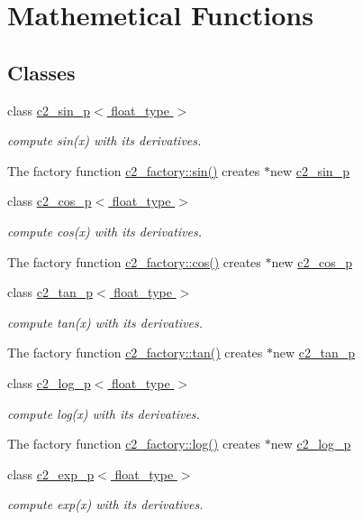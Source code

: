 \hypertarget{group__math__functions}{}\section{Mathemetical Functions}
\label{group__math__functions}
\subsection*{Classes}
\begin{DoxyCompactItemize}
\item 
class \hyperlink{classc2__sin__p}{c2\+\_\+sin\+\_\+p$<$ float\+\_\+type $>$}
\begin{DoxyCompactList}\small\item\em compute sin(x) with its derivatives.

The factory function \hyperlink{classc2__factory_a866854d4fdd6c6678512151dbcd635a5}{c2\+\_\+factory\+::sin()} creates $\ast$new \hyperlink{classc2__sin__p}{c2\+\_\+sin\+\_\+p} \end{DoxyCompactList}\item 
class \hyperlink{classc2__cos__p}{c2\+\_\+cos\+\_\+p$<$ float\+\_\+type $>$}
\begin{DoxyCompactList}\small\item\em compute cos(x) with its derivatives.

The factory function \hyperlink{classc2__factory_abc5ea51417ecef590629a39f7a2227e4}{c2\+\_\+factory\+::cos()} creates $\ast$new \hyperlink{classc2__cos__p}{c2\+\_\+cos\+\_\+p} \end{DoxyCompactList}\item 
class \hyperlink{classc2__tan__p}{c2\+\_\+tan\+\_\+p$<$ float\+\_\+type $>$}
\begin{DoxyCompactList}\small\item\em compute tan(x) with its derivatives.

The factory function \hyperlink{classc2__factory_a2f83cbd3be646166f7e3bef1e27244b9}{c2\+\_\+factory\+::tan()} creates $\ast$new \hyperlink{classc2__tan__p}{c2\+\_\+tan\+\_\+p} \end{DoxyCompactList}\item 
class \hyperlink{classc2__log__p}{c2\+\_\+log\+\_\+p$<$ float\+\_\+type $>$}
\begin{DoxyCompactList}\small\item\em compute log(x) with its derivatives.

The factory function \hyperlink{classc2__factory_af20c7c4fee421c8ee0b51bac1c42302e}{c2\+\_\+factory\+::log()} creates $\ast$new \hyperlink{classc2__log__p}{c2\+\_\+log\+\_\+p} \end{DoxyCompactList}\item 
class \hyperlink{classc2__exp__p}{c2\+\_\+exp\+\_\+p$<$ float\+\_\+type $>$}
\begin{DoxyCompactList}\small\item\em compute exp(x) with its derivatives.


\end{DoxyCompactList}
\end{DoxyCompactItemize}
